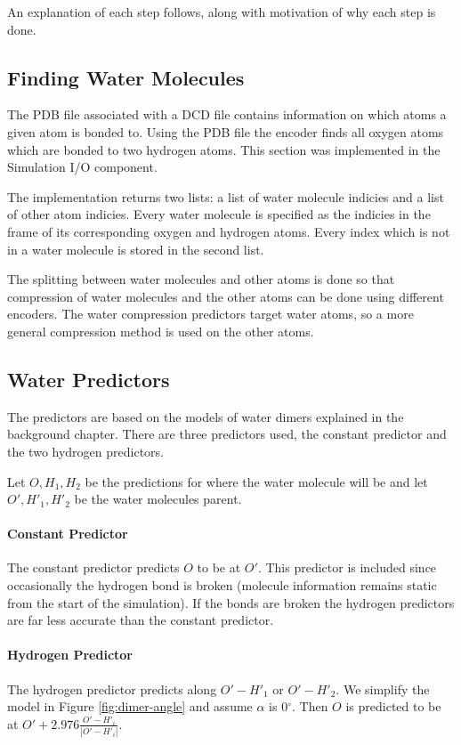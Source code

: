 \documentclass[a4paper]{report}
\newcommand{\degree}{\ensuremath{^\circ}}
\begin{document}
An explanation of each step follows, along with motivation of why each step is
done.


\subsection{Finding Water Molecules}

The PDB file associated with a DCD file contains information on which atoms a
given atom is bonded to. Using the PDB file the encoder finds all oxygen atoms
which are bonded to two hydrogen atoms. This section was implemented in the
Simulation I/O component.

The implementation returns two lists: a list of water molecule indicies and a
list of other atom indicies. Every water molecule is specified as the indicies
in the frame of its corresponding oxygen and hydrogen atoms. Every index which
is not in a water molecule is stored in the second list.

The splitting between water molecules and other atoms is done so that
compression of water molecules and the other atoms can be done using different
encoders. The water compression predictors target water atoms, so a more
general compression method is used on the other atoms.


\subsection{Water Predictors}
\label{sec:water-predictors}

The predictors are based on the models of water dimers explained in the
background chapter. There are three predictors used, the constant predictor
and the two hydrogen predictors.

Let $O, H_1, H_2$ be the predictions for where the water molecule will be and
let $O', H'_1, H'_2$ be the water molecules parent.

\paragraph{Constant Predictor}
The constant predictor predicts $O$ to be at $O'$. This predictor is included
since occasionally the hydrogen bond is broken (molecule information remains
static from the start of the simulation). If the bonds are broken the hydrogen
predictors are far less accurate than the constant predictor.

\paragraph{Hydrogen Predictor}
The hydrogen predictor predicts along $O'-H'_1$ or $O'-H'_2$. We simplify the
model in Figure \ref{fig:dimer-angle} and assume $\alpha$ is $0\degree$. Then
$O$ is predicted to be at $O' + 2.976\frac{O'-H'_i}{|O'-H'_i|}$.
\end{document}
